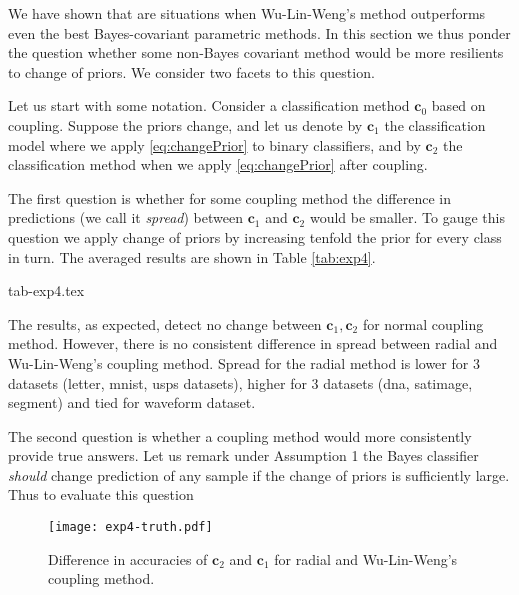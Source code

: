 We have shown that are situations when Wu-Lin-Weng's method outperforms even the best Bayes-covariant parametric methods. In this section we thus ponder the question whether some non-Bayes covariant method would be more resilients to change of priors. We consider two facets to this question.

Let us start with some notation. Consider a classification method $\boldsymbol{c}_0$ based on coupling. Suppose the priors change, and let us denote by $\boldsymbol{c}_1$ the classification model where we apply \eqref{eq:changePrior} to binary classifiers, and by $\boldsymbol{c}_2$ the classification method when we apply \eqref{eq:changePrior} after coupling. 

The first question is whether for some coupling method the difference in predictions (we call it \emph{spread}) between $\boldsymbol{c}_1$ and $\boldsymbol{c}_2$ would be smaller. To gauge this question we apply change of priors by increasing tenfold the prior for every class in turn.  The averaged results are shown in Table \ref{tab:exp4}. 

 {tab-exp4.tex}

The results, as expected, detect no change between $\boldsymbol{c}_1, \boldsymbol{c}_2$ for normal coupling method. However, there is no consistent difference in spread between radial and Wu-Lin-Weng's coupling method. Spread for the radial method is lower for 3 datasets (letter, mnist, usps datasets), higher for 3 datasets (dna, satimage, segment) and tied for waveform dataset.

The second question is whether a coupling method would more consistently provide true answers. Let us remark under Assumption 1 the Bayes classifier \emph{should} change prediction of any sample if the change of priors is sufficiently large. Thus to evaluate this question 

\begin{figure}[!ht]
	\texttt{[image: exp4-truth.pdf]}
	\caption{Difference in accuracies of $\boldsymbol{c}_2$ and $\boldsymbol{c}_1$ for radial and Wu-Lin-Weng's coupling method.}
	\label{fig:score}
\end{figure}
